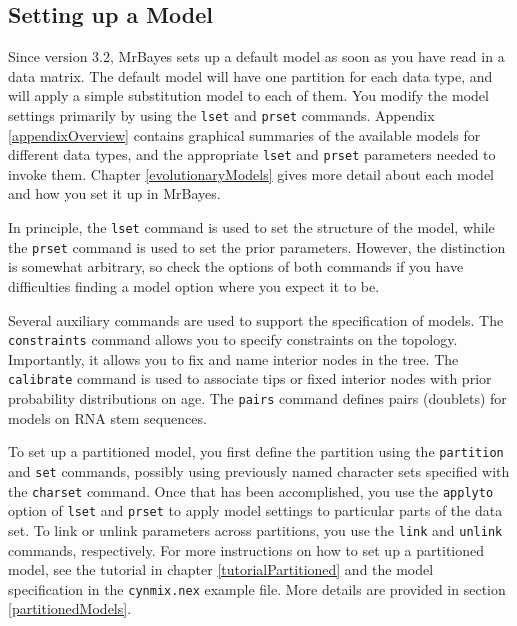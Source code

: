 \documentclass[12pt]{book}
\begin{document}
\subsection{Setting up a Model}

Since version 3.2, MrBayes sets up a default model as soon as you have read in a data matrix. The
default model will have one partition for each data type, and will apply a simple substitution
model to each of them. You modify the model settings primarily by using the \texttt{lset} and
\texttt{prset} commands. Appendix \ref{appendixOverview} contains graphical summaries of the
available models for different data types, and the appropriate \texttt{lset} and \texttt{prset}
parameters needed to invoke them. Chapter \ref{evolutionaryModels} gives more detail about each
model and how you set it up in MrBayes.

In principle, the \texttt{lset} command is used to set the structure of the model, while the
\texttt{prset} command is used to set the prior parameters. However, the distinction is somewhat
arbitrary, so check the options of both commands if you have difficulties finding a model option
where you expect it to be.

Several auxiliary commands are used to support the specification of models. The
\texttt{constraints} command allows you to specify constraints on the topology. Importantly, it
allows you to fix and name interior nodes in the tree. The \texttt{calibrate} command is used to
associate tips or fixed interior nodes with prior probability distributions on age. The
\texttt{pairs} command defines pairs (doublets) for models on RNA stem sequences.

To set up a partitioned model, you first define the partition using the \texttt{partition} and
\texttt{set} commands, possibly using previously named character sets specified with the
\texttt{charset} command. Once that has been accomplished, you use the \texttt{applyto} option of
\texttt{lset} and \texttt{prset} to apply model settings to particular parts of the data set. To
link or unlink parameters across partitions, you use the \texttt{link} and \texttt{unlink}
commands, respectively. For more instructions on how to set up a partitioned model, see the
tutorial in chapter \ref{tutorialPartitioned} and the model specification in the
\texttt{cynmix.nex} example file. More details are provided in section \ref{partitionedModels}.
\end{document}
